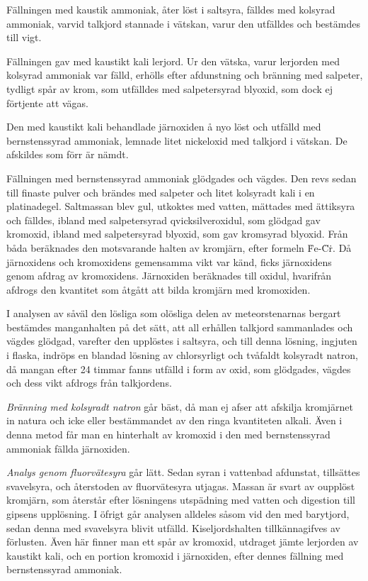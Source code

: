 \documentclass[a4paper, 12pt, oneside, swedish]{article}
\begin{document}
Fällningen med kaustik ammoniak, åter löst i saltsyra, fälldes med kolsyrad ammoniak, varvid talkjord stannade i vätskan, varur den utfälldes och bestämdes till vigt.

Fällningen gav med kaustikt kali lerjord. Ur den vätska, varur lerjorden med kolsyrad ammoniak var fälld, erhölls efter afdunstning och bränning med salpeter, tydligt spår av krom, som utfälldes med salpetersyrad blyoxid, som dock ej förtjente att vägas.

Den med kaustikt kali behandlade järnoxiden å nyo löst och utfälld med bernstenssyrad ammoniak, lemnade litet nickeloxid med talkjord i vätskan. De afskildes som förr är nämdt.

Fällningen med bernstenssyrad ammoniak glödgades och vägdes. Den revs sedan till finaste pulver och brändes med salpeter och litet kolsyradt kali i en platinadegel. Saltmassan blev gul, utkoktes med vatten, mättades med ättiksyra och fälldes, ibland med salpetersyrad qvicksilveroxidul, som glödgad gav kromoxid, ibland med salpetersyrad blyoxid, som gav kromsyrad blyoxid. Från båda beräknades den motsvarande halten av kromjärn, efter formeln \.{F}e-\"{C}\.{r}. Då järnoxidens och kromoxidens gemensamma vikt var känd, ficks järnoxidens genom afdrag av kromoxidens. Järnoxiden beräknades till oxidul, hvarifrån afdrogs den kvantitet som åtgått att bilda kromjärn med kromoxiden.

I analysen av såväl den lösliga som olösliga delen av meteorstenarnas bergart bestämdes manganhalten på det sätt, att all erhållen talkjord sammanlades och vägdes glödgad, varefter den upplöstes i saltsyra, och till denna lösning, ingjuten i flaska, indröps en blandad lösning av chlorsyrligt och tvåfaldt kolsyradt natron, då mangan efter 24 timmar fanns utfälld i form av oxid, som glödgades, vägdes och dess vikt afdrogs från talkjordens.

\emph{Bränning med kolsyradt natron} går bäst, då man ej afser att afskilja kromjärnet in natura och icke eller bestämmandet av den ringa kvantiteten alkali. Även i denna metod får man en hinterhalt av kromoxid i den med bernstenssyrad ammoniak fällda järnoxiden.

\emph{Analys genom fluorvätesyra} går lätt. Sedan syran i vattenbad afdunstat, tillsättes svavelsyra, och återstoden av fluorvätesyra utjagas. Massan är svart av oupplöst kromjärn, som återstår efter lösningens utspädning med vatten och digestion till gipsens upplösning. I öfrigt går analysen alldeles såsom vid den med barytjord, sedan denna med svavelsyra blivit utfälld. Kiseljordshalten tillkännagifves av förlusten. Även här finner man ett spår av kromoxid, utdraget jämte lerjorden av kaustikt kali, och en portion kromoxid i järnoxiden, efter dennes fällning med bernstenssyrad ammoniak.
\end{document}
